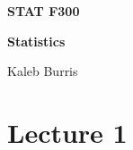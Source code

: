 \documentclass[12pt, letterpaper]{book}
\begin{document}
    \begin{titlepage}
        \Huge \textbf{STAT F300}

        \huge \textbf{Statistics}

        \vfill

        \Large Kaleb Burris
    \end{titlepage}

    \section*{Lecture 1}
    
    
\end{document}
